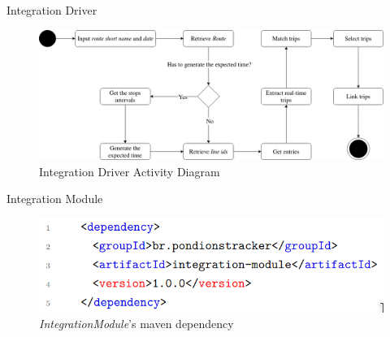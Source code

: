 \documentclass[xcolor=dvipsnames,table]{beamer}
\begin{document}
\begin{frame}{Integration Driver}
        \begin{figure}[H]
                \centering
                \includegraphics[width = \textwidth]{images/integrationDriverAD.drawio.png}
                \caption{Integration Driver Activity Diagram}
        \end{figure}
\end{frame}
\begin{frame}{Integration Module}
        \begin{figure}[H]
                \centering
                \includegraphics[scale=0.45]{images/mdIntegrationModule.png}
                \caption{\textit{IntegrationModule}'s maven dependency}
        \end{figure}
\end{frame}
\end{document}
